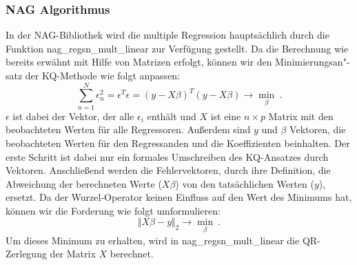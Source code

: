 \subsubsection{NAG Algorithmus}

In der NAG-Bibliothek wird die multiple Regression hauptsächlich durch die Funktion nag\_regsn\_mult\_linear zur Verfügung gestellt.
Da die Berechnung wie bereits erwähnt mit Hilfe von Matrizen erfolgt, können wir den Minimierungsan"-satz der KQ-Methode wie folgt anpassen:
\begin{equation*}
  \label{eq:minimization}
  \sum\limits^{N}_{n=1} \epsilon^2_n = \epsilon^T \epsilon = (y - X \beta)^T (y - X \beta) \rightarrow \min\limits_{\beta} ~.
\end{equation*}
$\epsilon$ ist dabei der Vektor, der alle $\epsilon_i$ enthält und $X$ ist eine $n \times p$ Matrix mit den beobachteten Werten für alle Regressoren.
Außerdem sind $y$ und $\beta$ Vektoren, die beobachteten Werten für den Regressanden und die Koeffizienten beinhalten. 
Der erste Schritt ist dabei nur ein formales Umschreiben des KQ-Ansatzes durch Vektoren.
Anschließend werden die Fehlervektoren, durch ihre Definition, die Abweichung der berechneten Werte ($X\beta$) von den tatsächlichen Werten ($y$), ersetzt.
Da der Wurzel-Operator keinen Einfluss auf den Wert des Minimums hat, können wir die Forderung wie folgt umformulieren:
\begin{equation*}
  \label{eq:minimization_general}
  \Vert X\beta - y \Vert_2 \rightarrow \min\limits_{\beta} ~.
\end{equation*}
Um dieses Minimum zu erhalten, wird in nag\_regsn\_mult\_linear die QR-Zerlegung der Matrix $X$ berechnet.

